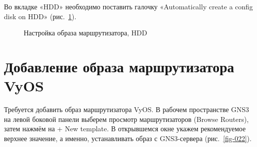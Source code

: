 \documentclass[
  english,
  russian,
  12pt,
  a4paper,
  DIV=11,
  numbers=noendperiod]{scrreprt}
\begin{document}
Во вкладке «HDD» необходимо поставить галочку «Automatically create a
config disk on HDD» (рис.~\ref{fig-021}).

\begin{figure}


\caption{\label{fig-021}Настройка образа маршрутизатора, HDD}

\end{figure}%

\section{Добавление образа маршрутизатора
VyOS}\label{ux434ux43eux431ux430ux432ux43bux435ux43dux438ux435-ux43eux431ux440ux430ux437ux430-ux43cux430ux440ux448ux440ux443ux442ux438ux437ux430ux442ux43eux440ux430-vyos}

Требуется добавить образ маршрутизатора VyOS. В рабочем пространстве
GNS3 на левой боковой панели выберем просмотр маршрутизаторов (Browse
Routers), затем нажмём на + New template. В открывшемся окне укажем
рекомендуемое верхнее значение, а именно, устанавливать образ с
GNS3-сервера (рис.~\ref{fig-022}).
\end{document}
